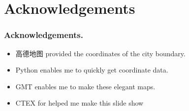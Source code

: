 \section{Acknowledgements}
\begin{frame}
    \frametitle{Acknowledgements.}
    \begin{itemize}
        \item 高德地图 provided the coordinates of the city boundary.
        \item Python enables me to quickly get coordinate data.
        \item GMT enables me to make these elegant maps.
        \item CTEX for helped me make this slide show
    \end{itemize}
\end{frame}